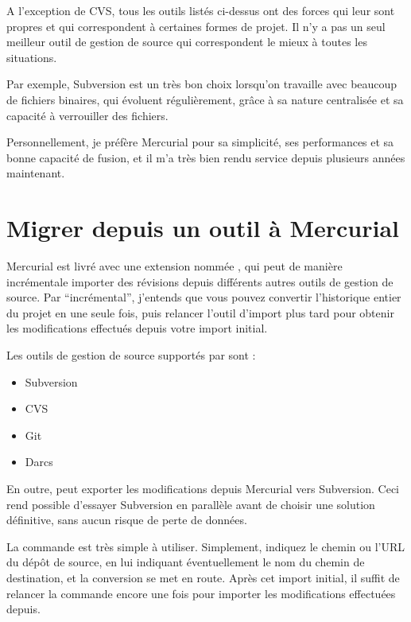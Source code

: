 A l'exception de CVS, tous les outils listés ci-dessus ont des 
forces qui leur sont propres et qui correspondent à certaines
formes de projet. Il n'y a pas un seul meilleur outil de gestion
de source qui correspondent le mieux à toutes les situations.

Par exemple, Subversion est un très bon choix lorsqu'on travaille
avec beaucoup de fichiers binaires, qui évoluent régulièrement, grâce
à sa nature centralisée et sa capacité à verrouiller des fichiers.

Personnellement, je préfère Mercurial pour sa simplicité, ses 
performances et sa bonne capacité de fusion, et il m'a très bien rendu service
depuis plusieurs années maintenant.

\section{Migrer depuis un outil à Mercurial}

Mercurial est livré avec une extension nommée , qui
peut de manière incrémentale importer des révisions depuis différents
autres outils de gestion de source. Par ``incrémental'', j'entends que
vous pouvez convertir l'historique entier du projet en une seule fois,
puis relancer l'outil d'import plus tard pour obtenir les modifications
effectués depuis votre import initial.

Les outils de gestion de source supportés par  sont :
\begin{itemize}
	\item Subversion
	\item CVS
	\item Git
	\item Darcs
\end{itemize}

En outre,  peut exporter les modifications depuis Mercurial
vers Subversion. Ceci rend possible d'essayer Subversion en parallèle 
avant de choisir une solution définitive, sans aucun risque de perte de
données.

La commande  est très simple à utiliser. Simplement,
indiquez le chemin ou l'URL du dépôt de source, en lui indiquant éventuellement
le nom du chemin de destination, et la conversion se met en route. Après cet
import initial, il suffit de relancer la commande encore une fois pour 
importer les modifications effectuées depuis.

